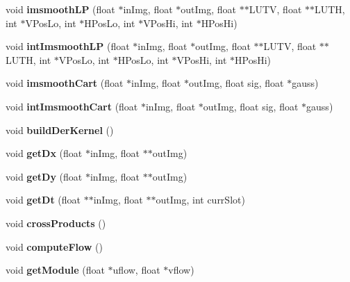 \begin{DoxyCompactItemize}
\item 
void {\bfseries imsmooth\+L\+P} (float $\ast$in\+Img, float $\ast$out\+Img, float $\ast$$\ast$L\+U\+T\+V, float $\ast$$\ast$L\+U\+T\+H, int $\ast$V\+Pos\+Lo, int $\ast$H\+Pos\+Lo, int $\ast$V\+Pos\+Hi, int $\ast$H\+Pos\+Hi)\label{classoFlow_a1be94585aabb422b899bacbee3667914}

\item 
void {\bfseries int\+Imsmooth\+L\+P} (float $\ast$in\+Img, float $\ast$out\+Img, float $\ast$$\ast$L\+U\+T\+V, float $\ast$$\ast$L\+U\+T\+H, int $\ast$V\+Pos\+Lo, int $\ast$H\+Pos\+Lo, int $\ast$V\+Pos\+Hi, int $\ast$H\+Pos\+Hi)\label{classoFlow_a03c90973cd1667e08154c628adcae690}

\item 
void {\bfseries imsmooth\+Cart} (float $\ast$in\+Img, float $\ast$out\+Img, float sig, float $\ast$gauss)\label{classoFlow_a9be27e89c43ca6a984a6b6e99222784f}

\item 
void {\bfseries int\+Imsmooth\+Cart} (float $\ast$in\+Img, float $\ast$out\+Img, float sig, float $\ast$gauss)\label{classoFlow_a45b875234541731acd1f38ef50397d2a}

\item 
void {\bfseries build\+Der\+Kernel} ()\label{classoFlow_a69cb58503518f509b784184b9cc452f0}

\item 
void {\bfseries get\+Dx} (float $\ast$in\+Img, float $\ast$$\ast$out\+Img)\label{classoFlow_a1cd02a6e073072524d3e5e00501d5036}

\item 
void {\bfseries get\+Dy} (float $\ast$in\+Img, float $\ast$$\ast$out\+Img)\label{classoFlow_a8ebb0c6493369fc3a08976e8b1f1d03f}

\item 
void {\bfseries get\+Dt} (float $\ast$$\ast$in\+Img, float $\ast$$\ast$out\+Img, int curr\+Slot)\label{classoFlow_a60086004fc8f1dfb0d3277020722e00b}

\item 
void {\bfseries cross\+Products} ()\label{classoFlow_acb92dc84416b69a7e9010fe1603b4777}

\item 
void {\bfseries compute\+Flow} ()\label{classoFlow_ab795bd7fca1b319fc778f6373f95436d}

\item 
void {\bfseries get\+Module} (float $\ast$uflow, float $\ast$vflow)\label{classoFlow_acae8ec6c49e82757fdcf7fda10495b69}


\end{DoxyCompactItemize}
